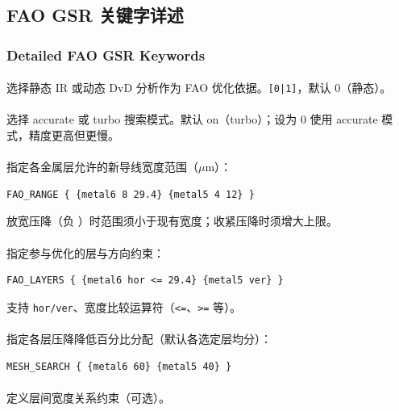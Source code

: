 \begin{seeAlsoBox}
\subsection{FAO GSR 关键字详述}
\subsubsection*{Detailed FAO GSR Keywords}

\paragraph{}
选择静态 IR 或动态 DvD 分析作为 FAO 优化依据。\texttt{[0|1]}，默认 0（静态）。

\paragraph{}
选择 accurate 或 turbo 搜索模式。默认 on（turbo）；设为 0 使用 accurate 模式，精度更高但更慢。

\paragraph{}
指定各金属层允许的新导线宽度范围（$\mu$m）：
\begin{lstlisting}
FAO_RANGE { {metal6 8 29.4} {metal5 4 12} }
\end{lstlisting}
放宽压降（负 ）时范围须小于现有宽度；收紧压降时须增大上限。

\paragraph{}
指定参与优化的层与方向约束：
\begin{lstlisting}
FAO_LAYERS { {metal6 hor <= 29.4} {metal5 ver} }
\end{lstlisting}
支持 \texttt{hor/ver}、宽度比较运算符（\texttt{<=}、\texttt{>=} 等）。

\paragraph{}
指定各层压降降低百分比分配（默认各选定层均分）：
\begin{lstlisting}
MESH_SEARCH { {metal6 60} {metal5 40} }
\end{lstlisting}

\paragraph{}
定义层间宽度关系约束（可选）。


\end{seeAlsoBox}
